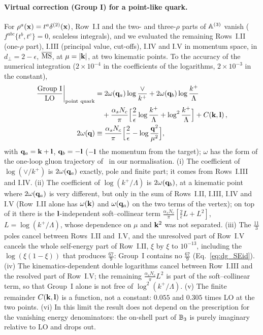 \paragraph{Virtual correction (Group I) for a point-like quark.} For $\rho^a(\mathbf{x})=t^a\delta^{(2)}(\mathbf{x})$, Row~I.I and the two- and three-$\rho$ parts of $\mathbb{A}^{(3)}$ vanish ($f^{abc}\{t^b,t^c\}=0$, scaleless integrals), and we evaluated the remaining Rows~I.II (one-$\rho$ part), I.III (principal value, cut-offs), I.IV and I.V in momentum space, in $d_\perp=2-\epsilon$, $\overline{\rm MS}$, at $\mu=|\mathbf{k}|$, at two kinematic points. To the accuracy of the numerical integration ($2\times10^{-4}$ in the coefficients of the logarithms, $2\times10^{-3}$ in the constant),
\begin{align}\label{eq:dilute_groupI}
\frac{\text{Group I}}{\rm LO}\bigg|_{\rm point\ quark}&=2\omega(\mathbf{q}_a)\log\frac{\vee}{k^+}+2\omega(\mathbf{q}_b)\log\frac{k^+}{\Lambda}\notag\\&\quad+\frac{\alpha_sN_c}{\pi}\Big[\frac2\epsilon\log\frac{k^+}{\Lambda}+\log^2\frac{k^+}{\Lambda}\Big]+C(\mathbf{k},\mathbf{l})\,,\notag\\
2\omega(\mathbf{q})&\equiv\frac{\alpha_sN_c}{\pi}\Big[\frac2\epsilon-\log\frac{\mathbf{q}^2}{\mu^2}\Big],
\end{align}
with $\mathbf{q}_a=\mathbf{k}+\mathbf{l}$, $\mathbf{q}_b=-\mathbf{l}$ ($-\mathbf{l}$ the momentum from the target); $\omega$ has the form of the one-loop gluon trajectory of~\cite{Fadin:1998py} in our normalisation. (i) The coefficient of $\log(\vee/k^+)$ is $2\omega(\mathbf{q}_a)$ exactly, pole and finite part; it comes from Rows~I.III and I.IV. (ii) The coefficient of $\log(k^+/\Lambda)$ is $2\omega(\mathbf{q}_b)$, at a kinematic point where $2\omega(\mathbf{q}_a)$ is very different, but only in the sum of Rows~I.II, I.III, I.IV and I.V (Row~I.II alone has $\omega(\mathbf{k})$ and $\omega(\mathbf{q}_a)$ on the two terms of the vertex); on top of it there is the $\mathbf{l}$-independent soft--collinear term $\frac{\alpha_sN_c}{\pi}[\frac2\epsilon L+L^2]$, $L=\log(k^+/\Lambda)$, whose dependence on $\mu$ and $\mathbf{k}^2$ was not separated. (iii) The $\frac{11}{3}$ poles cancel between Rows~I.II and~I.V, and the unresolved part of Row~I.V cancels the whole self-energy part of Row~I.II, $\xi$ by $\xi$ to $10^{-13}$, including the $\log(\xi(1-\xi))$ that produces $\frac{67}{9}$: Group~I contains no $\frac{67}{9}$ (Eq.~\eqref{eq:dg_SEid}). (iv) The kinematics-dependent double logarithms cancel between Row~I.III and the resolved part of Row~I.V; the remaining $\frac{\alpha_sN_c}{\pi}L^2$ is part of the soft--collinear term, so that Group~I alone is not free of $\log^2(k^+/\Lambda)$. (v) The finite remainder $C(\mathbf{k},\mathbf{l})$ is a function, not a constant: $0.055$ and $0.305$ times LO at the two points. (vi) In this limit the result does not depend on the prescription for the vanishing energy denominators: the on-shell part of $\mathbb{B}_3$ is purely imaginary relative to LO and drops out.

